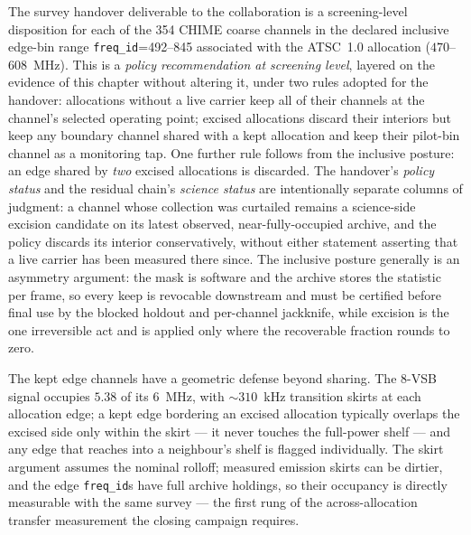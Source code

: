 The survey handover deliverable to the collaboration is a screening-level disposition for each of the 354 CHIME coarse channels in the declared inclusive edge-bin range \texttt{freq\_id}=492--845 associated with the ATSC~1.0 allocation ($470$--$608$~MHz). This is a \emph{policy recommendation at screening level}, layered on the evidence of this chapter without altering it, under two rules adopted for the handover: allocations without a live carrier keep all of their channels at the channel's selected operating point; excised allocations discard their interiors but keep any boundary channel shared with a kept allocation and keep their pilot-bin channel as a monitoring tap. One further rule follows from the inclusive posture: an edge shared by \emph{two} excised allocations is discarded. The handover's \emph{policy status} and the residual chain's \emph{science status} are intentionally separate columns of judgment: a channel whose collection was curtailed remains a science-side excision candidate on its latest observed, near-fully-occupied archive, and the policy discards its interior conservatively, without either statement asserting that a live carrier has been measured there since. The inclusive posture generally is an asymmetry argument: the mask is software and the archive stores the statistic per frame, so every keep is revocable downstream and must be certified before final use by the blocked holdout and per-channel jackknife, while excision is the one irreversible act and is applied only where the recoverable fraction rounds to zero.

The kept edge channels have a geometric defense beyond sharing. The 8-VSB signal occupies $5.38$ of its $6$~MHz, with ${\sim}310$~kHz transition skirts at each allocation edge; a kept edge bordering an excised allocation typically overlaps the excised side only within the skirt --- it never touches the full-power shelf --- and any edge that reaches into a neighbour's shelf is flagged individually. The skirt argument assumes the nominal rolloff; measured emission skirts can be dirtier, and the edge \texttt{freq\_id}s have full archive holdings, so their occupancy is directly measurable with the same survey --- the first rung of the across-allocation transfer measurement the closing campaign requires.



